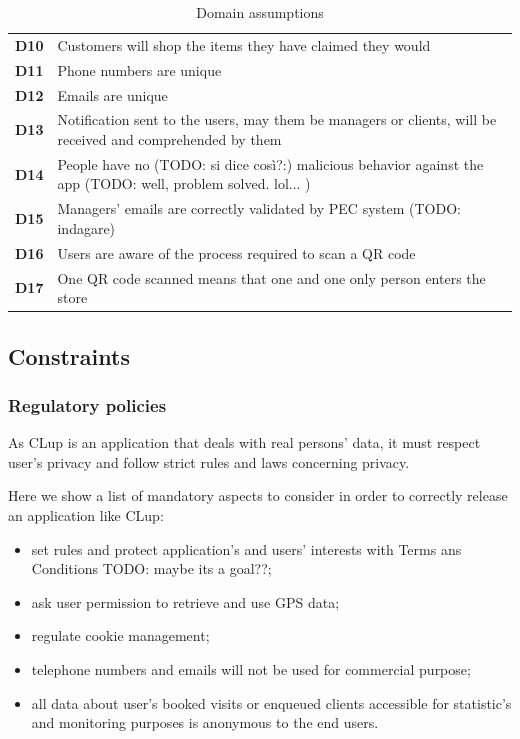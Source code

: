 \begin{table}[h!]
\begin{tabular}{@{}P{0.1\textwidth}P{0.80\textwidth}@{}}
        \textbf{D10}       & Customers will shop the items they have claimed they would\\
        \textbf{D11}       & Phone numbers are unique\\
        \textbf{D12}       & Emails are unique\\
        \textbf{D13}       & Notification sent to the users, may them be managers or clients, will be received and comprehended by them\\
        \textbf{D14}       & People have no (TODO: si dice così?:) malicious behavior against the app (TODO: well, problem solved. lol... )\\
        \textbf{D15}       & Managers' emails are correctly validated by PEC system (TODO: indagare)\\
        \textbf{D16}       & Users are aware of the process required to scan a QR code\\
        \textbf{D17}       & One QR code scanned means that one and one only person enters the store\\
        \bottomrule
    \end{tabular}
\caption{Domain assumptions}
\label{table:domainassumptions}
\end{table}

\FloatBarrier

\subsection{Constraints}
\label{subsect:contraints}

\subsubsection{Regulatory policies}
\label{subsubsect:regulatorypolicies}

As CLup is an application that deals with real persons' data, it must respect user's privacy and follow strict rules and laws concerning privacy.

Here we show a list of mandatory aspects to consider in order to correctly release an application like CLup:
\begin{itemize}
    \item set rules and protect application's and users' interests with Terms ans Conditions TODO: maybe its a goal??;
    \item ask user permission to retrieve and use GPS data;
    \item regulate cookie management;
    \item telephone numbers and emails will not be used for commercial purpose;
    \item all data about user's booked visits or enqueued clients accessible for statistic's and monitoring purposes is anonymous to the end users.
\end{itemize}

